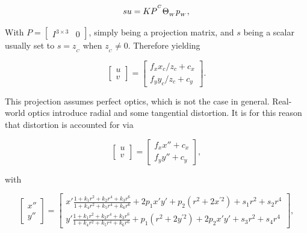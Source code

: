\begin{equation}
    su = K P {}^{^C}\Theta_{_W} p_{_W},
\end{equation}

With $P = \begin{bmatrix}
    I^{3\times3} &  0
\end{bmatrix}$, simply being a projection matrix, and $s$ being a scalar usually set to $s = z_{_C}$ when $z_{_C} \neq 0$. Therefore yielding

\begin{equation}
    \begin{bmatrix}
        u \\
        v
    \end{bmatrix} = \begin{bmatrix}
        f_x x_c/z_c + c_x \\
        f_y y_c/z_c + c_y
    \end{bmatrix}.
\end{equation}

This projection assumes perfect optics, which is not the case in general. Real-world optics introduce radial and some tangential distortion. It is for this reason that distortion is accounted for via

\begin{equation}
    \begin{bmatrix}
        u \\
        v
    \end{bmatrix} = \begin{bmatrix}
        f_x x'' + c_x \\
        f_y y'' + c_y
    \end{bmatrix},
\end{equation}

with

\begin{equation}
    \begin{bmatrix}
        x'' \\
        y''
    \end{bmatrix}=\begin{bmatrix}
        x' \frac{1+k_1 r^2+k_2 r^4+k_3 r^6}{1+k_4 r^2+k_5 r^4+k_6 r^6}+2 p_1 x' y'+p_2\left(r^2+2 x^{\prime 2}\right)+s_1 r^2+s_2 r^4 \\
        y' \frac{1+k_1 r^2+k_2 r^4+k_3 r^6}{1+k_4 r^2+k_5 r^4+k_6 r^6}+p_1\left(r^2+2 y^{\prime 2}\right)+2 p_2 x' y'+s_3 r^2+s_4 r^4
    \end{bmatrix},
\end{equation}

